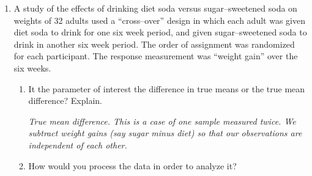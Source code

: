\begin{enumerate}
\begin{enumerate}
\begin{key}
  {\it Each driver does the same course twice -- once while reading a
    text and again without the phone.}
\end{key}
\item How could randomization be used?
\begin{students}
    \vspace{1cm}    
\end{students}

\begin{key}
  {\it Randomly (flip a coin?) select whether each driver gets the
    text reading first or second.}
\end{key}
\item Alternately, they could just test half their subjects
        while reading a text and half without the texting.  Which
        study design do you recommend?  Explain why.
\begin{students}
\vspace{4cm}
\end{students}

\begin{key}
  {\it Pairing seems like a good idea because some people have faster
    reaction times than others. By subtracting two reaction times you
    get rid of other effects such as age or sleepiness. }
\end{key}
\end{enumerate}

\item A study of the effects of drinking diet soda versus
  sugar--sweetened soda on weights of 32 adults used a ``cross--over''
  design in which each adult was given diet soda to drink for one six
  week period, and given sugar--sweetened soda to drink in another six
  week period.  The order of assignment was randomized for each
  participant.  The response measurement was ``weight gain'' over the
  six weeks.
  \begin{enumerate}
  \item It the parameter of interest the difference in true means or
    the true mean difference?  Explain.
\begin{students}
\vspace{3cm}
\end{students}

\begin{key}
  {\it True mean difference. This is a case of one sample measured
    twice.  We subtract weight gains (say sugar minus diet) so that
    our observations are independent of each other.}
\end{key}
\item How would you process the data in order to analyze it? 
\begin{students}
\vspace{2cm}
\end{students}


\end{enumerate}
\end{enumerate}
